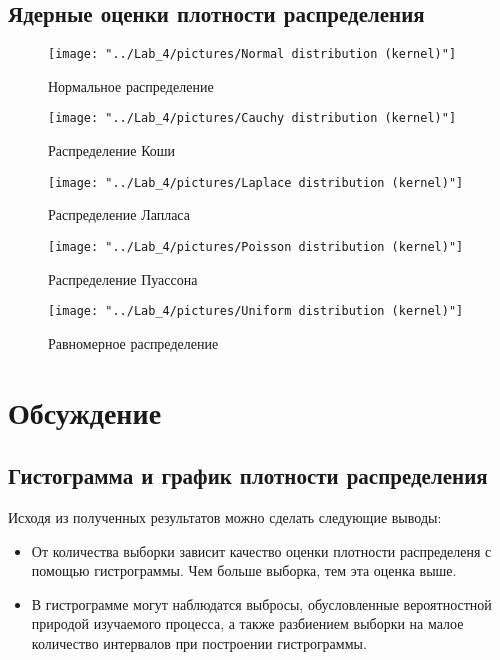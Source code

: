 \documentclass[12pt,a4paper]{article}
\begin{document}
	\subsection{Ядерные оценки плотности распределения}
		\begin{center}
			\begin{figure}[H]
				\texttt{[image: "../Lab\_4/pictures/Normal distribution (kernel)"]} 
				\caption[Нормальное распределение]{Нормальное распределение}
			\end{figure}
			
			\begin{figure}[H]
				\texttt{[image: "../Lab\_4/pictures/Cauchy distribution (kernel)"]}
				\caption[Распределение Коши]{Распределение Коши}
			\end{figure}
			
			\begin{figure}[H]
				\texttt{[image: "../Lab\_4/pictures/Laplace distribution (kernel)"]}
				\caption[Распределение Лапласа]{Распределение Лапласа}
			\end{figure}
			
			\begin{figure}[hp!]
				\texttt{[image: "../Lab\_4/pictures/Poisson distribution (kernel)"]}
				\caption[Распределение Пуассона]{Распределение Пуассона}
			\end{figure}
			
			\begin{figure}[hp!]			
				\texttt{[image: "../Lab\_4/pictures/Uniform distribution (kernel)"]}
				\caption[Равномерное распределение]{Равномерное распределение}
			\end{figure}
		\end{center}
	
\newpage
\section{Обсуждение}
	\subsection{Гистограмма и график плотности распределения}
		Исходя из полученных результатов можно сделать следующие выводы:
		\begin{itemize}
			\item От количества выборки зависит качество оценки плотности распределеня с помощью гистрограммы. Чем больше выборка, тем эта оценка выше.
			
			\item В гистрограмме могут наблюдатся выбросы, обусловленные вероятностной природой изучаемого процесса, а также разбиением выборки на малое количество интервалов при построении гистрограммы.
		\end{itemize}
\end{document}
